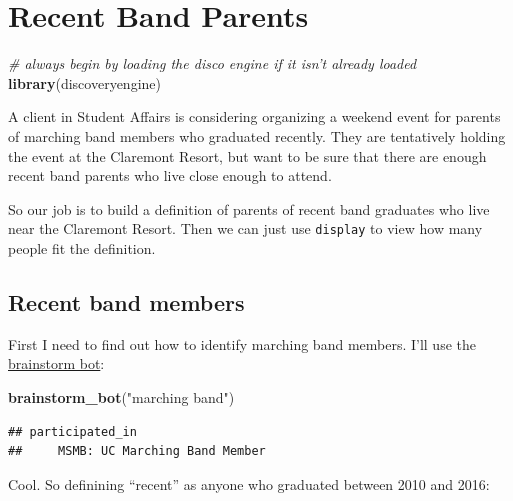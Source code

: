 \documentclass[]{book}
\newenvironment{Shaded}{\begin{snugshade}}{\end{snugshade}}
\newcommand{\CommentTok}[1]{\textcolor[rgb]{0.56,0.35,0.01}{\textit{#1}}}
\newcommand{\DecValTok}[1]{\textcolor[rgb]{0.00,0.00,0.81}{#1}}
\newcommand{\KeywordTok}[1]{\textcolor[rgb]{0.13,0.29,0.53}{\textbf{#1}}}
\newcommand{\NormalTok}[1]{#1}
\newcommand{\OperatorTok}[1]{\textcolor[rgb]{0.81,0.36,0.00}{\textbf{#1}}}
\newcommand{\StringTok}[1]{\textcolor[rgb]{0.31,0.60,0.02}{#1}}
\begin{document}
\hypertarget{ex-recent-band-parents}{%
\chapter{Recent Band Parents}\label{ex-recent-band-parents}}

\begin{Shaded}
\begin{Highlighting}[]
\CommentTok{# always begin by loading the disco engine if it isn't already loaded}
\KeywordTok{library}\NormalTok{(discoveryengine)}
\end{Highlighting}
\end{Shaded}

A client in Student Affairs is considering organizing a weekend event for parents of marching band members who graduated recently. They are tentatively holding the event at the Claremont Resort, but want to be sure that there are enough recent band parents who live close enough to attend.

So our job is to build a definition of parents of recent band graduates who live near the Claremont Resort. Then we can just use \texttt{display} to view how many people fit the definition.

\hypertarget{recent-band-members}{%
\section{Recent band members}\label{recent-band-members}}

First I need to find out how to identify marching band members. I'll use the \protect\hyperlink{brainstorm-bot}{brainstorm bot}:

\begin{Shaded}
\begin{Highlighting}[]
\KeywordTok{brainstorm_bot}\NormalTok{(}\StringTok{"marching band"}\NormalTok{)}
\end{Highlighting}
\end{Shaded}

\begin{verbatim}
## participated_in 
##     MSMB: UC Marching Band Member
\end{verbatim}

Cool. So definining ``recent'' as anyone who graduated between 2010 and 2016:

\begin{Shaded}
\end{Shaded}
\end{document}
